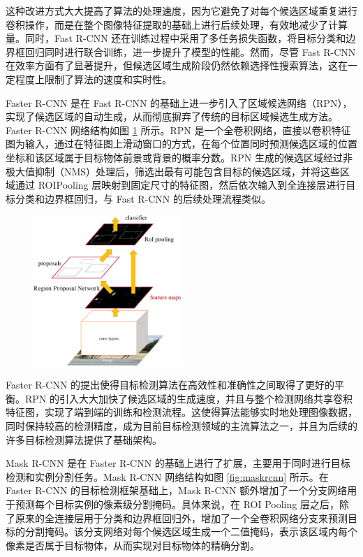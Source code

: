 这种改进方式大大提高了算法的处理速度，因为它避免了对每个候选区域重复进行卷积操作，而是在整个图像特征提取的基础上进行后续处理，有效地减少了计算量。同时，Fast R-CNN 还在训练过程中采用了多任务损失函数，将目标分类和边界框回归同时进行联合训练，进一步提升了模型的性能。然而，尽管 Fast R-CNN 在效率方面有了显著提升，但候选区域生成阶段仍然依赖选择性搜索算法，这在一定程度上限制了算法的速度和实时性。

Faster R-CNN 是在 Fast R-CNN 的基础上进一步引入了区域候选网络（RPN），实现了候选区域的自动生成，从而彻底摒弃了传统的目标区域候选生成方法。 Faster R-CNN 网络结构如图 \ref{fig:fasterrcnn} 所示。RPN 是一个全卷积网络，直接以卷积特征图为输入，通过在特征图上滑动窗口的方式，在每个位置同时预测候选区域的位置坐标和该区域属于目标物体前景或背景的概率分数。RPN 生成的候选区域经过非极大值抑制（NMS）处理后，筛选出最有可能包含目标的候选区域，并将这些区域通过 ROIPooling 层映射到固定尺寸的特征图，然后依次输入到全连接层进行目标分类和边界框回归，与 Fast R-CNN 的后续处理流程类似。

\begin{figure}[htbp]
    \centering
    \includegraphics[width=0.5\textwidth]{../figure/fasterrcnn.png}
    \captionsetup{font=footnotesize}
    \label{fig:fasterrcnn}
\end{figure}

Faster R-CNN 的提出使得目标检测算法在高效性和准确性之间取得了更好的平衡。RPN 的引入大大加快了候选区域的生成速度，并且与整个检测网络共享卷积特征图，实现了端到端的训练和检测流程。这使得算法能够实时地处理图像数据，同时保持较高的检测精度，成为目前目标检测领域的主流算法之一，并且为后续的许多目标检测算法提供了基础架构。

Mask R-CNN 是在 Faster R-CNN 的基础上进行了扩展，主要用于同时进行目标检测和实例分割任务。Mask R-CNN 网络结构如图 \ref{fig:maskrcnn} 所示。在 Faster R-CNN 的目标检测框架基础上，Mask R-CNN 额外增加了一个分支网络用于预测每个目标实例的像素级分割掩码。具体来说，在 ROI Pooling 层之后，除了原来的全连接层用于分类和边界框回归外，增加了一个全卷积网络分支来预测目标的分割掩码。该分支网络对每个候选区域生成一个二值掩码，表示该区域内每个像素是否属于目标物体，从而实现对目标物体的精确分割。


